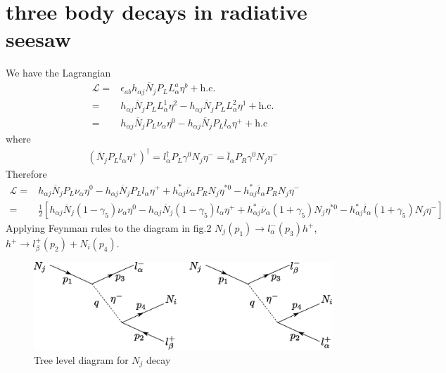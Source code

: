 \section{three body decays in radiative seesaw}
\label{sec:three-body-decays}
We have the Lagrangian \cite{Sierra:2008wj}
\begin{align}
  \mathcal{L}=&\epsilon_{a b}  h_{\alpha j}\overline{N}_j P_L L_\alpha^a \eta^b + \mbox{h.c.}\nonumber\\
  =&h_{\alpha j}\overline{N}_j P_L L_\alpha^1 \eta^2- h_{\alpha j}\overline{N}_j P_L L_\alpha^2 \eta^1+ \mbox{h.c.}\nonumber\\
  =&h_{\alpha j}\overline{N}_j P_L \nu_\alpha \eta^0- h_{\alpha j}\overline{N}_j P_L l_\alpha \eta^++\text{h.c}
\end{align}
where
\begin{align}
  (\overline{N}_j P_L l_\alpha \eta^+)^\dagger=l_\alpha^\dagger P_L\gamma^0N_j\eta^-=\bar{l}_\alpha P_R\gamma^0N_j\eta^-
\end{align}
Therefore
\begin{align}
     \mathcal{L}=&h_{\alpha j}\overline{N}_j P_L \nu_\alpha \eta^0- h_{\alpha j}\overline{N}_j P_L l_\alpha \eta^+
   +h_{\alpha j}^*\overline{\nu}_\alpha P_R N_j \eta^{*0}- h_{\alpha j}^*\overline{l}_\alpha P_R {N}_j \eta^- \nonumber\\
  =&\frac{1}{2}\left[h_{\alpha j}\overline{N}_j (1-\gamma_5) \nu_\alpha \eta^0- h_{\alpha j}\overline{N}_j (1-\gamma_5) l_\alpha \eta^+
   +h_{\alpha j}^*\overline{\nu}_\alpha (1+\gamma_5) N_j \eta^{*0}- h_{\alpha j}^*\overline{l}_\alpha (1+\gamma_5) {N}_j \eta^- \right]
\end{align}
Applying Feynman  rules  to the diagram in fig.2 $N_j(p_1) \to l^-_\alpha(p_3) h^+$, $h^+\to l^+_\beta(p_2)+N_i(p_4)$. 
\begin{figure} %
  \centering %
  \includegraphics[scale=0.7]{nj_decay} %
  \caption{Tree level diagram for $N_j$ decay } %
  \label{fig:2} %
\end{figure} %


